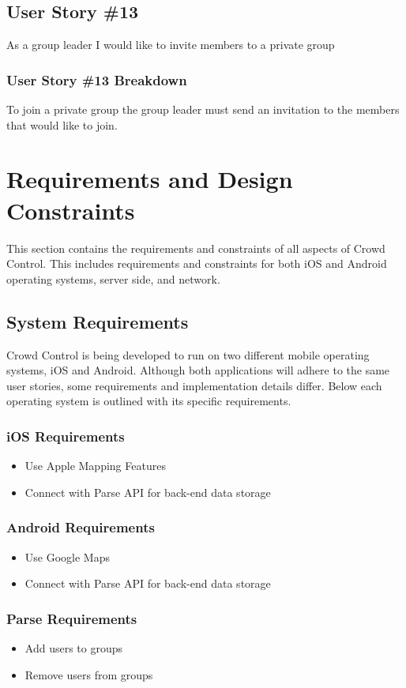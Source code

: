 \subsection{User Story \#13}
As a group leader I would like to invite members to a private group
\subsubsection{User Story \#13 Breakdown}
To join a private group the group leader must send an invitation to the members that would like to join. 

\section{Requirements and Design Constraints}
This section contains the requirements and constraints of all aspects of Crowd Control.  This includes requirements and constraints for both iOS and Android operating systems, server side, and network.


\subsection{System Requirements}

Crowd Control is being developed to run on two different mobile operating systems, iOS and Android.  Although both applications will adhere to the same user stories, some requirements and implementation details differ.  Below each operating system is outlined with its specific requirements.

\subsubsection{iOS Requirements}
\begin{itemize}
\item{Use Apple Mapping Features}
\item{Connect with Parse API for back-end data storage}
\end{itemize}
\subsubsection{Android Requirements}
\begin{itemize}
\item{Use Google Maps}
\item{Connect with Parse API for back-end data storage}
\end{itemize}
\subsubsection{Parse Requirements}
\begin{itemize}
\item{Add users to groups}
\item{Remove users from groups}
\end{itemize}

